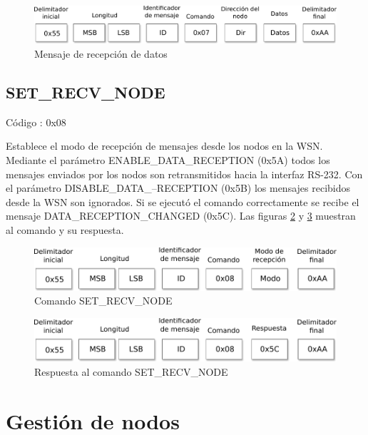 \begin{figure}
	\centering 
	\includegraphics[scale=0.7]{capitulo_3_imgs/res_from_node.pdf}
	\caption{Mensaje de recepción de datos}
	\label{fig:res_from_node}
\end{figure}

\subsection{SET\_RECV\_NODE}

Código : 0x08

Establece el modo de recepción de mensajes desde los nodos en la WSN. Mediante el parámetro ENABLE\_DATA\_RECEPTION (0x5A) todos los mensajes enviados por los nodos son retransmitidos hacia la interfaz RS-232. Con el parámetro DISABLE\_DATA\_--RECEPTION (0x5B) los mensajes recibidos desde la WSN son ignorados. Si se ejecutó el comando correctamente se recibe el mensaje DATA\_RECEPTION\_CHANGED (0x5C). Las figuras \ref{fig:cmd_set_recv} y \ref{fig:res_set_recv} muestran al comando y su respuesta. 

\begin{figure}
	\centering 
	\includegraphics[scale=0.7]{capitulo_3_imgs/cmd_data_recv.pdf}
	\caption{Comando SET\_RECV\_NODE}
	\label{fig:cmd_set_recv}
\end{figure}

\begin{figure}
	\centering
	\includegraphics[scale=0.7]{capitulo_3_imgs/res_data_recv.pdf}
	\caption{Respuesta al comando SET\_RECV\_NODE}
	\label{fig:res_set_recv}
\end{figure}

\section{Gestión de nodos}

